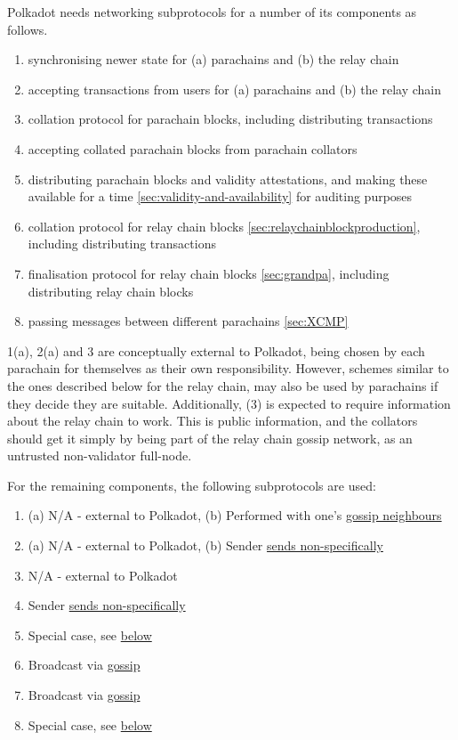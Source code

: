 Polkadot needs networking subprotocols for a number of its components as follows.
\begin{enumerate}
\item synchronising newer state for (a) parachains and (b) the relay chain
\item accepting transactions from users for (a) parachains and (b) the relay chain
\item collation protocol for parachain blocks, including distributing transactions
\item accepting collated parachain blocks from parachain collators
\item distributing parachain blocks and validity attestations, and making these available for a time \ref{sec:validity-and-availability} for auditing purposes
\item collation protocol for relay chain blocks \ref{sec:relaychainblockproduction}, including distributing transactions
\item finalisation protocol for relay chain blocks \ref{sec:grandpa}, including distributing relay chain blocks
\item passing messages between different parachains \ref{sec:XCMP}
\end{enumerate}

1(a), 2(a) and 3 are conceptually external to Polkadot, being chosen by each parachain for themselves as their own responsibility. However, schemes similar to the ones described below for the relay chain, may also be used by parachains if they decide they are suitable. Additionally, (3) is expected to require information about the relay chain to work. This is public information, and the collators should get it simply by being part of the relay chain gossip network, as an untrusted non-validator full-node.

For the remaining components, the following subprotocols are used:

\begin{enumerate}
\item (a) N/A - external to Polkadot, (b) Performed with one's \hyperref[sec:gossiping]{gossip neighbours}
\item (a) N/A - external to Polkadot, (b) Sender \hyperref[sec:net_service]{sends non-specifically}
\item N/A - external to Polkadot
\item Sender \hyperref[sec:net_service]{sends non-specifically}
\item Special case, see \hyperref[sec:net_storage]{below}
\item Broadcast via \hyperref[sec:gossiping]{gossip}
\item Broadcast via \hyperref[sec:gossiping]{gossip}
\item Special case, see \hyperref[sec:net_crosschain]{below}
\end{enumerate}

